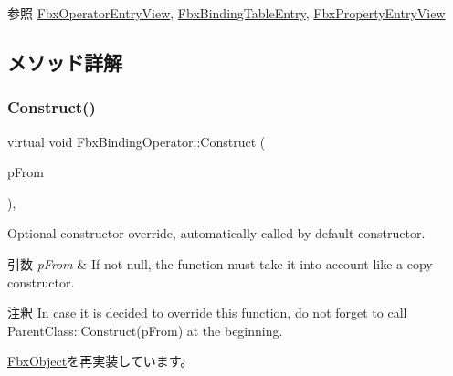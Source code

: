 \begin{DoxySeeAlso}{参照}
\hyperlink{class_fbx_operator_entry_view}{Fbx\+Operator\+Entry\+View}, \hyperlink{class_fbx_binding_table_entry}{Fbx\+Binding\+Table\+Entry}, \hyperlink{class_fbx_property_entry_view}{Fbx\+Property\+Entry\+View} 
\end{DoxySeeAlso}


\subsection{メソッド詳解}
\mbox{\label{class_fbx_binding_operator_addee18722d7806245f10a1c873bafaac}} 
\subsubsection{\texorpdfstring{Construct()}{Construct()}}
{\footnotesize\ttfamily virtual void Fbx\+Binding\+Operator\+::\+Construct (\begin{DoxyParamCaption}\item[{const \hyperlink{class_fbx_object}{Fbx\+Object} $\ast$}]{p\+From }\end{DoxyParamCaption})\hspace{0.3cm}{\ttfamily [protected]}, {\ttfamily [virtual]}}

Optional constructor override, automatically called by default constructor. 
\begin{DoxyParams}{引数}
{\em p\+From} & If not null, the function must take it into account like a copy constructor. \\
\hline
\end{DoxyParams}
\begin{DoxyRemark}{注釈}
In case it is decided to override this function, do not forget to call Parent\+Class\+::\+Construct(p\+From) at the beginning. 
\end{DoxyRemark}


\hyperlink{class_fbx_object_a313503bc645af3fdceb4a99ef5cea7eb}{Fbx\+Object}を再実装しています。

\mbox{\label{class_fbx_binding_operator_ab7e4a678475a62b3bf36b1171860c17e}} 
